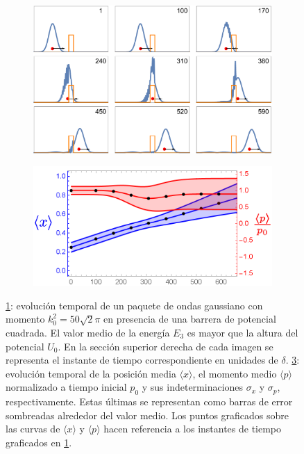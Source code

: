 \documentclass[aps,prb,twocolumn,superscriptaddress,floatfix,longbibliography]{revtex4-2}
\begin{document}
\begin{figure}
     \centering
     \begin{subfigure}[b]{0.45\textwidth}
         \centering
         \includegraphics[width=\textwidth]{evolution_2iii.pdf}
         \caption{\label{fig:evolution_2iii}}
     \end{subfigure}
     \hfill
     \begin{subfigure}[b]{0.45\textwidth}
         \centering
         \includegraphics[width=\textwidth]{valores_medios_2iii.png}
         \caption{\label{fig:valores_medios_2iii}}
     \end{subfigure}
     \caption{\ref{fig:evolution_2iii}: evolución temporal de un paquete de ondas gaussiano con momento $k_0^2 = 50 \sqrt{2} \pi$  en presencia de una barrera de potencial cuadrada. El valor medio de la energía $E_3$ es mayor que la altura del potencial $U_0$. En la sección superior derecha de cada imagen se representa el instante de tiempo correspondiente en unidades de $\delta$. \ref{fig:valores_medios_2iii}: evolución temporal de la posición media $\langle x \rangle$, el momento medio $\langle p \rangle$ normalizado a tiempo inicial $p_0$ y sus indeterminaciones $\sigma_x$ y $\sigma_p$, respectivamente. Estas últimas se representan como barras de error sombreadas alrededor del valor medio. Los puntos graficados sobre las curvas de $\langle x \rangle$ y $\langle p \rangle$ hacen referencia a los instantes de tiempo graficados en \ref{fig:evolution_2iii}.}
\end{figure}
\end{document}
